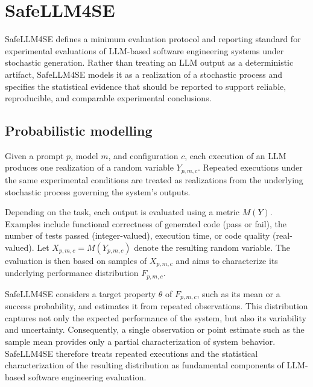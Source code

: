\documentclass{IEEEcsmag}
\begin{document}


\vspace*{-8pt}
\section{SafeLLM4SE}
\label{section:SafeLLM4SE}

SafeLLM4SE defines a minimum evaluation protocol and reporting standard for experimental evaluations of LLM-based software engineering systems under stochastic generation. Rather than treating an LLM output as a deterministic artifact, SafeLLM4SE models it as a realization of a stochastic process and specifies the statistical evidence that should be reported to support reliable, reproducible, and comparable experimental conclusions.


\subsection{Probabilistic modelling}
\label{subsection:SafeLLM4SE:probabilistic-modelling}

Given a prompt $p$, model $m$, and configuration $c$, each execution of an LLM produces one realization of a random variable $Y_{p,m,c}$. Repeated executions under the same experimental conditions are treated as realizations from the underlying stochastic process governing the system's outputs.

Depending on the task, each output is evaluated using a metric $M(Y)$. Examples include functional correctness of generated code (pass or fail), the number of tests passed (integer-valued), execution time, or code quality (real-valued). Let $X_{p,m,c}=M(Y_{p,m,c})$ denote the resulting random variable. The evaluation is then based on samples of $X_{p,m,c}$ and aims to characterize its underlying performance distribution $F_{p,m,c}$.

SafeLLM4SE considers a target property $\theta$ of $F_{p,m,c}$, such as its mean or a success probability, and estimates it from repeated observations. This distribution captures not only the expected performance of the system, but also its variability and uncertainty. Consequently, a single observation or point estimate such as the sample mean provides only a partial characterization of system behavior. SafeLLM4SE therefore treats repeated executions and the statistical characterization of the resulting distribution as fundamental components of LLM-based software engineering evaluation.
\end{document}
